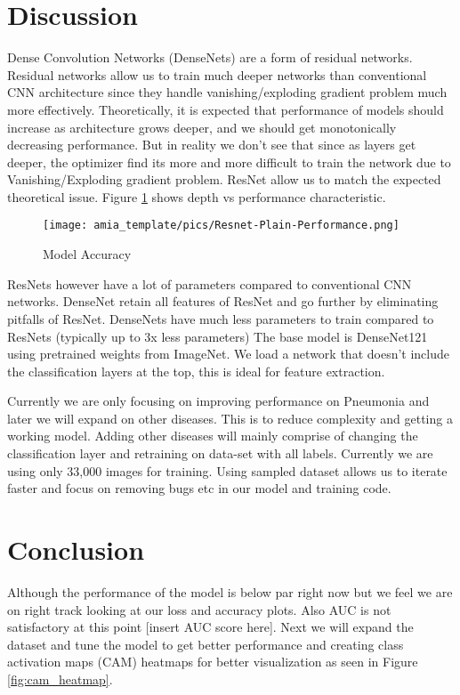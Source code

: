 \documentclass{amia}
\begin{document}
\section*{Discussion}
Dense Convolution Networks (DenseNets) are a form of residual networks. Residual networks allow us to train much deeper networks than conventional CNN architecture since they handle vanishing/exploding gradient problem much more effectively. Theoretically, it is expected that performance of models should increase as architecture grows deeper, and we should get monotonically decreasing performance. But in reality we don't see that since as layers get deeper, the optimizer find its more and more difficult to train the network due to Vanishing/Exploding gradient problem. ResNet allow us to match the expected theoretical issue. Figure \ref{fig3} shows depth vs performance characteristic.

\begin{figure}[h!]
\centering
\texttt{[image: amia\_template/pics/Resnet-Plain-Performance.png]}
\caption{Model Accuracy}
\label{fig3}
\end{figure}


ResNets however have a lot of parameters compared to conventional CNN networks. DenseNet retain all features of ResNet and go further by eliminating pitfalls of ResNet. DenseNets have much less parameters to train compared to ResNets (typically up to 3x less parameters)
The base model is DenseNet121 using pretrained weights from ImageNet. We load a network that doesn't include the classification layers at the top, this is ideal for feature extraction.

Currently we are only focusing on improving performance on Pneumonia and later we will expand on other diseases. This is to reduce complexity and getting a working model. Adding other diseases will mainly comprise of changing the classification layer and retraining on data-set with all labels. Currently we are using only 33,000 images for training. Using sampled dataset allows us to iterate faster and focus on removing bugs etc in our model and training code.
\section*{Conclusion}

Although the performance of the model is below par right now but we feel we are on right track looking at our loss and accuracy plots. Also AUC is not satisfactory at this point [insert AUC score here]. Next we will expand the dataset and tune the model to get better performance and creating class activation maps (CAM) heatmaps for better visualization as seen in Figure \ref{fig:cam_heatmap}.
\end{document}
